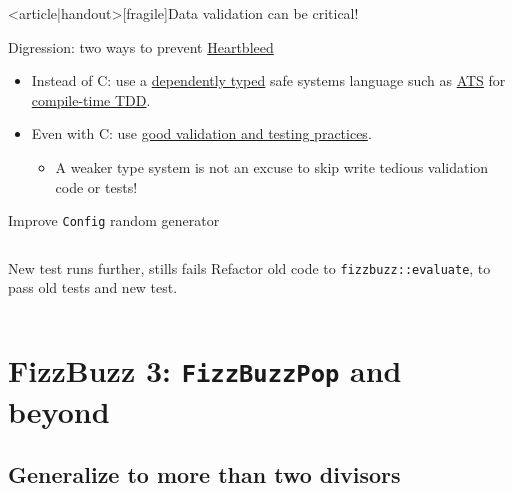 \begin{frame}<article|handout>[fragile]{Data validation can be critical!}
  \begin{block}{Digression: two ways to prevent \href{http://heartbleed.com/}{Heartbleed}}
    \begin{itemize}
    \item Instead of C: use a \href{http://en.wikipedia.org/wiki/Dependent_type}{dependently typed} safe systems language such as \href{http://www.ats-lang.org/}{ATS} for \href{http://bluishcoder.co.nz/2014/04/11/preventing-heartbleed-bugs-with-safe-languages.html}{compile-time TDD}.
    \item Even with C: use \href{http://martinfowler.com/articles/testing-culture.html}{good validation and testing practices}.
      \begin{itemize}
      \item A weaker type system is not an \alert{excuse} to skip
        write tedious validation code or tests!
      \end{itemize}
    \end{itemize}
  \end{block}
\end{frame}

\begin{frame}[fragile]{Improve \texttt{Config} random generator}
  \inputminted[gobble=2]{rust}{FizzBuzzSpec7.rs}
\end{frame}

\begin{frame}[fragile]{New test runs further, stills fails}
  Refactor old code to \texttt{fizzbuzz::evaluate}, to pass old tests and new test.

  \inputminted{rust}{FizzBuzz3Compile.rs}
\end{frame}

\section{FizzBuzz 3: \texttt{FizzBuzzPop} and beyond}

\subsection{Generalize to more than two divisors}

